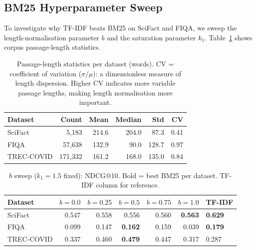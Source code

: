 \documentclass[12pt, a4paper]{article}
\makeatletter
\newcommand{\ndcg}{NDCG@10}
\newcommand{\tc}{TREC-COVID}
\newcommand{\fiqa}{FIQA}
\newcommand{\scifact}{SciFact}
\makeatother
\begin{document}
\subsection{BM25 Hyperparameter Sweep}
\label{sec:bm25_sweep}

To investigate why TF-IDF beats BM25 on \scifact{} and \fiqa{}, we sweep
the length-normalisation parameter $b$ and the saturation parameter $k_1$.
Table~\ref{tab:bm25_passage_stats} shows corpus passage-length statistics.

\begin{table}[h]
\centering
\caption{Passage-length statistics per dataset (words).  CV = coefficient of
  variation ($\sigma / \mu$): a dimensionless measure of length dispersion.
  Higher CV indicates more variable passage lengths, making length
  normalisation more important.}
\label{tab:bm25_passage_stats}
\begin{tabular}{lrrrrr}
\toprule
\textbf{Dataset} & \textbf{Count} & \textbf{Mean} & \textbf{Median} & \textbf{Std} & \textbf{CV} \\
\midrule
\scifact{} & 5,183   & 214.6 & 204.0 & 87.3  & 0.41 \\
\fiqa{}    & 57,638  & 132.9 & 90.0  & 128.7 & 0.97 \\
\tc{}      & 171,332 & 161.2 & 168.0 & 135.0 & 0.84 \\
\bottomrule
\end{tabular}
\end{table}

\begin{table}[h]
\centering
\caption{$b$ sweep ($k_1=1.5$ fixed): \ndcg{}.  Bold = best BM25 per dataset.
  TF-IDF column for reference.}
\label{tab:bm25_b_sweep}
\begin{tabular}{lrrrrrl}
\toprule
\textbf{Dataset} & $b=0.0$ & $b=0.25$ & $b=0.5$ & $b=0.75$ & $b=1.0$ & \textbf{TF-IDF} \\
\midrule
\scifact{}  & 0.547 & 0.558 & 0.556 & 0.560 & \textbf{0.563} & \textbf{0.629} \\
\fiqa{}     & 0.099 & 0.147 & \textbf{0.162} & 0.159 & 0.039 & \textbf{0.179} \\
\tc{}       & 0.337 & 0.460 & \textbf{0.479} & 0.447 & 0.317 & 0.287 \\
\bottomrule
\end{tabular}
\end{table}
\end{document}
